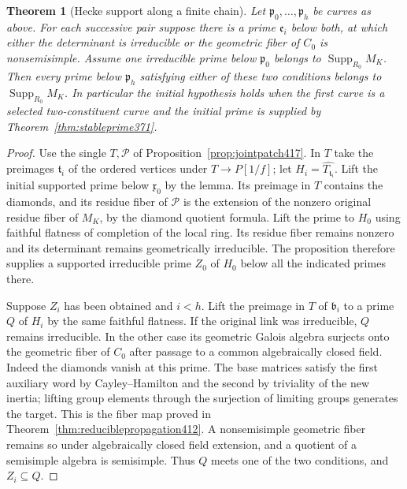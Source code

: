 \documentclass[a4paper,11pt]{article}
\newtheorem{theorem}[proposition]{Theorem}
\theoremstyle{definition}
\theoremstyle{remark}
\numberwithin{equation}{section}
\begin{document}
\begin{theorem}[Hecke support along a finite chain]\leavevmode
\label{thm:chaintransfer417}
Let \(\mathfrak p_0,\ldots,\mathfrak p_h\) be curves as above.
For each successive pair suppose there is a prime
\(\mathfrak e_i\) below both, at which either the determinant
is irreducible or the geometric fiber of \(C_0\) is
nonsemisimple. Assume one irreducible prime below
\(\mathfrak p_0\) belongs to \(\operatorname{Supp}_{R_0} M_K\).
Then every prime below \(\mathfrak p_h\) satisfying either of
these two conditions belongs to \(\operatorname{Supp}_{R_0} M_K\).
In particular the initial hypothesis holds when the first
curve is a selected two-constituent curve and the initial
prime is supplied by Theorem~\ref{thm:stableprime371}.
\end{theorem}
\begin{proof}
Use the single \(T,\mathcal P\) of
Proposition~\ref{prop:jointpatch417}. In \(T\) take the
preimages \(\mathfrak t_i\) of the ordered vertices under
\(T\to P[1/f]\); let \(H_i=\widehat{T_{\mathfrak t_i}}\).
Lift the initial supported prime below \(\mathfrak x_0\)
by the lemma. Its preimage in \(T\) contains the diamonds,
and its residue fiber of \(\mathcal P\) is the extension of
the nonzero original residue fiber of \(M_K\), by the
diamond quotient formula. Lift the prime to \(H_0\) using
faithful flatness of completion of the local ring. Its
residue fiber remains nonzero and its determinant remains
geometrically irreducible. The proposition therefore
supplies a supported irreducible prime \(Z_0\) of \(H_0\)
below all the indicated primes there.

Suppose \(Z_i\) has been obtained and \(i<h\). Lift the
preimage in \(T\) of \(\mathfrak b_i\) to a prime \(Q\) of
\(H_i\) by the same faithful flatness. If the original link
was irreducible, \(Q\) remains irreducible. In the other
case its geometric Galois algebra surjects onto the geometric
fiber of \(C_0\) after passage to a common algebraically closed
field. Indeed the diamonds vanish at this prime. The base
matrices satisfy the first auxiliary word by Cayley--Hamilton
and the second by triviality of the new inertia; lifting group
elements through the surjection of limiting groups generates
the target. This is the fiber map proved in
Theorem~\ref{thm:reduciblepropagation412}. A nonsemisimple
geometric fiber remains so under algebraically closed field
extension, and a quotient of a semisimple algebra is
semisimple. Thus \(Q\) meets one of the two conditions, and
\(Z_i\subseteq Q\).


\end{proof}
\end{document}
